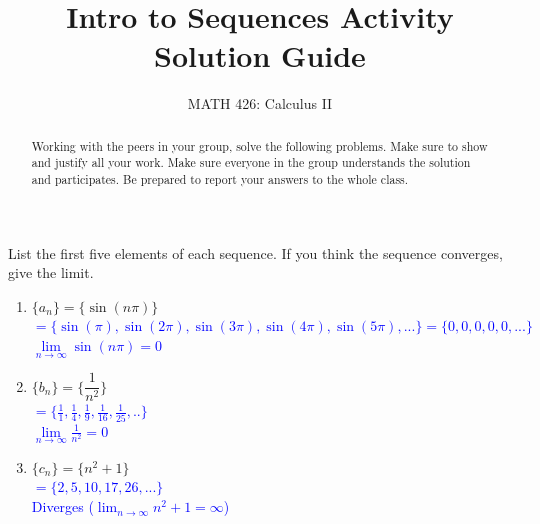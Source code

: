 \documentclass{ximera}
\title{Intro to Sequences Activity Solution Guide}
\author{MATH 426: Calculus II}
\begin{document}
\begin{abstract}
   Working with the peers in your group, solve the following problems. Make sure to show and justify all your work. Make sure everyone in the group understands the solution and participates. Be prepared to report your answers to the whole class. 
\end{abstract}
\maketitle

\begin{exercise}
 List the first five elements of each sequence.  If you think the sequence converges, give the limit.
\begin{enumerate}
    \item $\{a_n\}=\{\sin(n\pi)\}$\\
    \textcolor{blue}{ $=\{\sin(\pi), \sin(2\pi), \sin(3\pi),\sin(4\pi),\sin(5\pi),...\}=\{0,0,0,0,0,...\}$\\
    $\lim\limits_{n\rightarrow \infty}\sin(n\pi)=0$}
    \item $\{b_n\}=\bigg\{\dfrac{1}{n^2}\bigg\}$\\
    \textcolor{blue}{ $=\{\frac{1}{1}, \frac14, \frac19,\frac1{16}, \frac{1}{25},..\}$\\
    $\lim\limits_{n\rightarrow \infty} \frac{1}{n^2}=0$}
    \item $\{c_n\}=\{n^2+1\}$\\
    \textcolor{blue}{ $=\{2, 5, 10, 17, 26, ...\}$\\
    Diverges ($\lim_{n\rightarrow \infty}n^2+1=\infty$)}
\end{enumerate}

\end{exercise}
\end{document}
